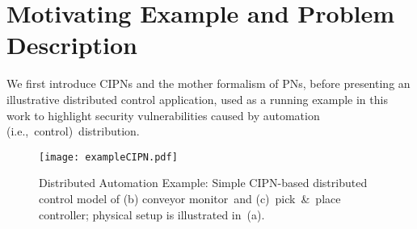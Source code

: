

\section{Motivating Example and Problem Description}
\label{sec:motivation}

We first introduce CIPNs and the mother formalism of PNs, before presenting an illustrative distributed control application, used as a running example in this work to highlight security vulnerabilities caused by automation (i.e.,~control)~distribution. %

%
\begin{figure}[!t]
	\centering
	\texttt{[image: exampleCIPN.pdf]}
	\caption{Distributed Automation Example: Simple CIPN-based distributed control model of (b) conveyor monitor~and (c)~pick~\&~place controller; physical setup is illustrated in~(a).}
	\label{fig:exampleCIPN}
\end{figure}


